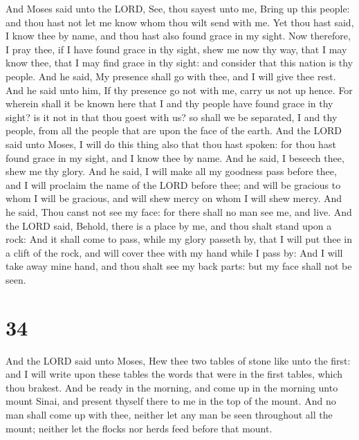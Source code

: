  And Moses said unto the LORD, See, thou sayest unto me,
Bring up this people: and thou hast not let me know whom thou wilt send
with me. Yet thou hast said, I know thee by name, and thou hast also
found grace in my sight.  Now therefore, I pray thee, if I
have found grace in thy sight, shew me now thy way, that I may know
thee, that I may find grace in thy sight: and consider that this nation
is thy people.  And he said, My presence shall go with
thee, and I will give thee rest.  And he said unto him, If
thy presence go not with me, carry us not up hence.  For
wherein shall it be known here that I and thy people have found grace in
thy sight? is it not in that thou goest with us? so shall we be
separated, I and thy people, from all the people that are upon the face
of the earth.  And the LORD said unto Moses, I will do this
thing also that thou hast spoken: for thou hast found grace in my sight,
and I know thee by name.  And he said, I beseech thee, shew
me thy glory.  And he said, I will make all my goodness
pass before thee, and I will proclaim the name of the LORD before thee;
and will be gracious to whom I will be gracious, and will shew mercy on
whom I will shew mercy.  And he said, Thou canst not see my
face: for there shall no man see me, and live.  And the
LORD said, Behold, there is a place by me, and thou shalt stand upon a
rock:  And it shall come to pass, while my glory passeth
by, that I will put thee in a clift of the rock, and will cover thee
with my hand while I pass by:  And I will take away mine
hand, and thou shalt see my back parts: but my face shall not be seen.

\hypertarget{section-33}{%
\section{34}\label{section-33}}

 And the LORD said unto Moses, Hew thee two tables of stone
like unto the first: and I will write upon these tables the words that
were in the first tables, which thou brakest.  And be ready
in the morning, and come up in the morning unto mount Sinai, and present
thyself there to me in the top of the mount.  And no man
shall come up with thee, neither let any man be seen throughout all the
mount; neither let the flocks nor herds feed before that mount.

